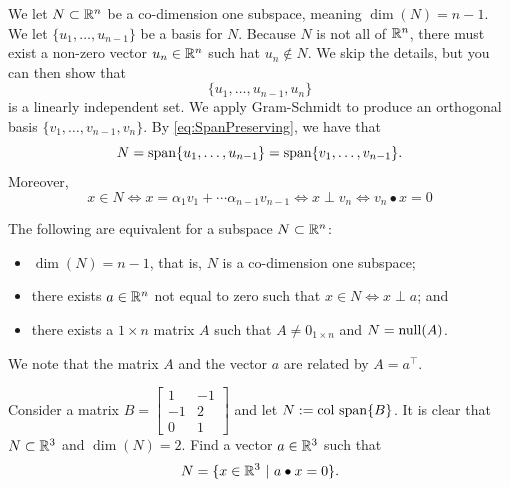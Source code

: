 We let $N \subset \mathbb R^n$ be a co-dimension one subspace, meaning $\dim(N)=n-1$. We let $\{ u_1, \ldots, u_{n-1} \}$ be a basis for $N$. Because $N$ is not all of $\mathbb R^n$, there must exist a non-zero vector $u_n\in \mathbb R^n$ such hat $u_n \not \in N$. We skip the details, but you can then show that $$\{ u_1, \ldots, u_{n-1}, u_n \}$$
is a linearly independent set. We apply Gram-Schmidt to produce an orthogonal basis $\{ v_1, \ldots, v_{n-1} , v_n\}$. By \eqref{eq:SpanPreserving}, we have that
$$ N = \mathrm{span} \{ u_1, \ldots, u_{n-1} \} = \mathrm{span} \{ v_1, \ldots, v_{n-1}  \}. $$
Moreover,
$$x \in N \iff x=\alpha_1 v_1 + \cdots \alpha_{n-1} v_{n-1} \iff x \perp v_n \iff v_n \bullet x = 0$$
\vspace*{.2cm}
\begin{tcolorbox}[title=\textbf{Hyper Subspaces and Dot Products}]
The following are equivalent for a subspace $N \subset \mathbb R^n$:
\begin{itemize}
    \item $\dim(N)=n-1$, that is, $N$ is a co-dimension one subspace;
    \item there exists $a\in \mathbb R^n$ not equal to zero such that $x\in N \iff x \perp a$; and
    \item there exists a $1 \times n$ matrix $A$ such that $A \neq 0_{1 \times n}$ and $N=\mathrm{null}(A)$.
 \end{itemize}
   
\end{tcolorbox}
\vspace*{.2cm}

We note that the matrix $A$ and the vector $a$ are related by $A=a^\top$.

\vspace*{.2cm}

\begin{example}
\label{ex:CoDimensionOneSubspace}
Consider a matrix $B=\left[ \begin{array}{rr} 1 & -1 \\ -1 & 2 \\ 0 & 1\end{array} \right] $ and let $N:=\mathrm{col~span} \{ B \}$. It is clear that $N \subset \mathbb R^3$ and $\dim(N)=2$. Find a vector $a\in \mathbb R^3$ such that 
$$N=\{ x\in \mathbb R^3~|~ a\bullet x = 0 \}. $$
\end{example}

